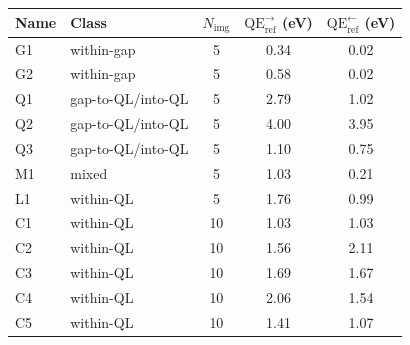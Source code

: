 \begin{tabular}{llccc}
\toprule
Name & Class & $N_\mathrm{img}$ & $\mathrm{QE}_{\mathrm{ref}}^{\rightarrow}$ (eV) & $\mathrm{QE}_{\mathrm{ref}}^{\leftarrow}$ (eV)  \\
\midrule
G1 & within-gap & 5 & 0.34 & 0.02  \\
G2 & within-gap & 5 & 0.58 & 0.02  \\
Q1 & gap-to-QL/into-QL & 5 & 2.79 & 1.02  \\
Q2 & gap-to-QL/into-QL & 5 & 4.00 & 3.95  \\
Q3 & gap-to-QL/into-QL & 5 & 1.10 & 0.75  \\
M1 & mixed & 5 & 1.03 & 0.21  \\
L1 & within-QL & 5 & 1.76 & 0.99  \\
C1 & within-QL & 10 & 1.03 & 1.03  \\
C2 & within-QL & 10 & 1.56 & 2.11  \\
C3 & within-QL & 10 & 1.69 & 1.67  \\
C4 & within-QL & 10 & 2.06 & 1.54  \\
C5 & within-QL & 10 & 1.41 & 1.07  \\
\bottomrule
\end{tabular}
